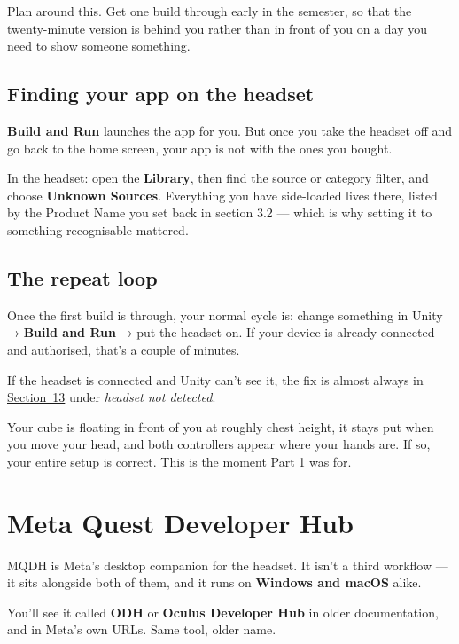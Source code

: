 \documentclass[11pt,a4paper]{article}
\begin{document}
Plan around this. Get one build through early in the semester, so that the twenty-minute
version is behind you rather than in front of you on a day you need to show someone
something.

\subsection{Finding your app on the headset}\label{finding-your-app-on-the-headset}

\textbf{Build and Run} launches the app for you. But once you take the headset off and go back
to the home screen, your app is not with the ones you bought.

In the headset: open the \textbf{Library}, then find the source or category filter, and choose
\textbf{Unknown Sources}. Everything you have side-loaded lives there, listed by the Product
Name you set back in section 3.2 --- which is why setting it to something recognisable
mattered.

\subsection{The repeat loop}\label{the-repeat-loop}

Once the first build is through, your normal cycle is: change something in Unity →
\textbf{Build and Run} → put the headset on. If your device is already connected and
authorised, that's a couple of minutes.

If the headset is connected and Unity can't see it, the fix is almost always in
\hyperref[troubleshooting]{Section~13} under \emph{headset not detected}.

\begin{keybox}[Checkpoint]
Your cube is floating in front of you at roughly chest height, it stays
put when you move your head, and both controllers appear where your hands are. If so,
your entire setup is correct. This is the moment Part 1 was for.
\end{keybox}


\section{Meta Quest Developer Hub}\label{meta-quest-developer-hub}

MQDH is Meta's desktop companion for the headset. It isn't a third workflow --- it sits
alongside both of them, and it runs on \textbf{Windows and macOS} alike.

You'll see it called \textbf{ODH} or \textbf{Oculus Developer Hub} in older documentation, and in
Meta's own URLs. Same tool, older name.
\end{document}
